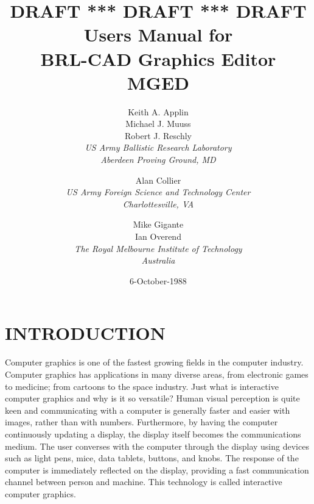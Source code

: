 \title{\bf{\huge{
DRAFT *** DRAFT *** DRAFT \\
Users Manual for \\
BRL-CAD Graphics Editor \\
MGED
}}}
\author{
Keith A. Applin \\
Michael J. Muuss \\
Robert J. Reschly \\
{\em US Army Ballistic Research Laboratory} \\
{\em Aberdeen Proving Ground, MD} \\
\and
Alan Collier \\
{\em US Army Foreign Science and Technology Center} \\
{\em Charlottesville, VA} \\
\and
Mike Gigante \\
Ian Overend \\
{\em The Royal Melbourne Institute of Technology} \\
{\em Australia}
}

\date{6-October-1988}

\maketitle

\tableofcontents
\listoffigures


\chapter{INTRODUCTION}

Computer graphics is one of the fastest growing fields
in the computer industry.
Computer graphics has applications in many diverse areas, from electronic
games to medicine; from cartoons to the space industry.  Just
what is interactive computer graphics and why is it so versatile?
Human visual perception is quite keen and communicating with a
computer is generally faster and easier
with images, rather than with
numbers. Furthermore, by
having the computer continuously updating a display,
the display itself becomes the communications medium.
The user converses with the computer through the display using
devices such as light pens,
mice, data tablets, buttons, and
knobs.  The response of the computer is immediately reflected
on the display,
providing a fast communication channel between person and machine.
This technology is called interactive computer graphics.

